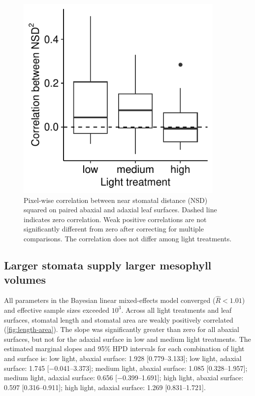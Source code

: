 \documentclass[webpdf,large,modern,unnumsec,namedate]{oup-authoring-template}
\begin{document}
\begin{figure}[ht]
\includegraphics[width = 4in]{figures/dual-surface.pdf}
\caption{Pixel-wise correlation between near stomatal distance (NSD) squared on paired abaxial and adaxial leaf surfaces. Dashed line indicates zero correlation. Weak positive correlations are not significantly different from zero after correcting for multiple comparisons. The correlation does not differ among light treatments.}
\label{fig:dual-surface}
\end{figure}

\subsection{Larger stomata supply larger mesophyll
volumes}\label{larger-stomata-supply-larger-mesophyll-volumes}

All parameters in the Bayesian linear mixed-effects model converged
(\(\hat{R} < 1.01\)) and effective sample sizes exceeded \(10^3\).
Across all light treatments and leaf surfaces, stomatal length and
stomatal area are weakly positively correlated
(\autoref{fig:length-area}). The slope was significantly greater than
zero for all abaxial surfaces, but not for the adaxial surface in low
and medium light treatments. The estimated marginal slopes and 95\% HPD
intervals for each combination of light and surface is: low light,
abaxial surface: 1.928 {[}\numrange{0.779}{3.133}{]}; low light, adaxial
surface: 1.745 {[}\numrange{-0.041}{3.373}{]}; medium light, abaxial
surface: 1.085 {[}\numrange{0.328}{1.957}{]}; medium light, adaxial
surface: 0.656 {[}\numrange{-0.399}{1.691}{]}; high light, abaxial
surface: 0.597 {[}\numrange{0.316}{0.911}{]}; high light, adaxial
surface: 1.269 {[}\numrange{0.831}{1.721}{]}.
\end{document}
